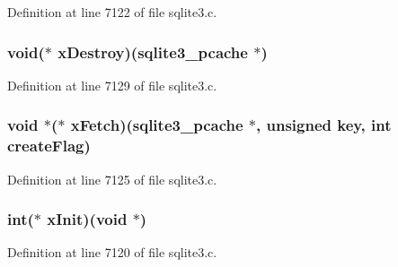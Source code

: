 Definition at line 7122 of file sqlite3.\+c.

\hypertarget{structsqlite3__pcache__methods_ac818e6091765fe201ab5727d515141a7}{}
\subsubsection[{x\+Destroy}]{\setlength{\rightskip}{0pt plus 5cm}void($\ast$ x\+Destroy)({\bf sqlite3\+\_\+pcache} $\ast$)}\label{structsqlite3__pcache__methods_ac818e6091765fe201ab5727d515141a7}


Definition at line 7129 of file sqlite3.\+c.

\hypertarget{structsqlite3__pcache__methods_a966011a4866c4856abe14aa532ce4098}{}
\subsubsection[{x\+Fetch}]{\setlength{\rightskip}{0pt plus 5cm}void $\ast$($\ast$ x\+Fetch)({\bf sqlite3\+\_\+pcache} $\ast$, unsigned key, int create\+Flag)}\label{structsqlite3__pcache__methods_a966011a4866c4856abe14aa532ce4098}


Definition at line 7125 of file sqlite3.\+c.

\hypertarget{structsqlite3__pcache__methods_a707c4748dcafc75384a806d13bb68bdd}{}
\subsubsection[{x\+Init}]{\setlength{\rightskip}{0pt plus 5cm}int($\ast$ x\+Init)(void $\ast$)}\label{structsqlite3__pcache__methods_a707c4748dcafc75384a806d13bb68bdd}


Definition at line 7120 of file sqlite3.\+c.

\hypertarget{structsqlite3__pcache__methods_a2b94d01bdb0e2496c486b48a37a00fea}{}
